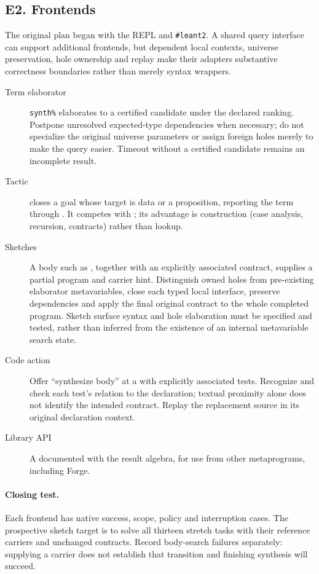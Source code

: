 \subsection{E2. Frontends}

The original plan began with the REPL and \texttt{\#leant2}. A shared query
interface can support additional frontends, but dependent local contexts,
universe preservation, hole ownership and replay make their adapters substantive
correctness boundaries rather than merely syntax wrappers.

\begin{description}
\item[Term elaborator] \texttt{synth\%} elaborates to a certified candidate
under the declared ranking. Postpone unresolved expected-type dependencies
when necessary; do not specialize the original universe parameters or assign
foreign holes merely to make the query easier. Timeout without a certified
candidate remains an incomplete result.
\item[Tactic]  closes a goal whose target is data or a proposition, reporting the term through . It competes with ; its advantage is construction (case analysis, recursion, contracts) rather than lookup.
\item[Sketches] A body such as
, together with an explicitly
associated contract, supplies a partial program and carrier hint. Distinguish
owned holes from pre-existing elaborator metavariables, close each typed local
interface, preserve dependencies and apply the final original contract to the
whole completed program. Sketch surface syntax and hole elaboration must be
specified and tested, rather than inferred from the existence of an internal
metavariable search state.
\item[Code action] Offer ``synthesize body'' at a  with explicitly
associated tests. Recognize and check each test's relation to the declaration;
textual proximity alone does not identify the intended contract. Replay the
replacement source in its original declaration context.
\item[Library API] A documented  with the result algebra, for use from other metaprograms, including Forge.
\end{description}

\paragraph{Closing test.} Each frontend has native success, scope, policy and
interruption cases. The prospective sketch target is to solve all thirteen
stretch tasks with their reference carriers and unchanged contracts. Record
body-search failures separately: supplying a carrier does not establish that
transition and finishing synthesis will succeed.

